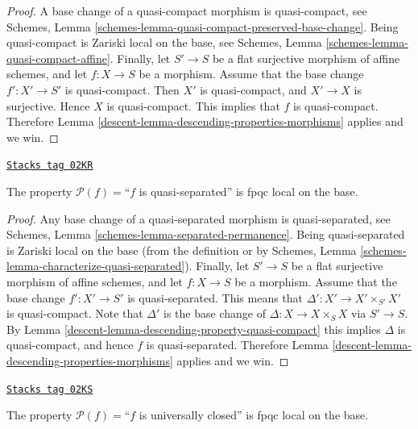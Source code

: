 \begin{proof}

A base change of a quasi-compact morphism is quasi-compact, see
Schemes, Lemma \ref{schemes-lemma-quasi-compact-preserved-base-change}.
Being quasi-compact is Zariski local on the base, see
Schemes, Lemma \ref{schemes-lemma-quasi-compact-affine}.
Finally, let
$S' \to S$ be a flat surjective morphism of affine schemes,
and let $f : X \to S$ be a morphism. Assume that the base change
$f' : X' \to S'$ is quasi-compact. Then $X'$ is quasi-compact,
and $X' \to X$ is surjective. Hence $X$ is quasi-compact.
This implies that $f$ is quasi-compact.
Therefore Lemma \ref{descent-lemma-descending-properties-morphisms} applies and we win.
\end{proof}

\begin{lemma}
\label{descent-lemma-descending-property-quasi-separated}
\href{https://stacks.math.columbia.edu/tag/02KR}{\texttt{Stacks tag 02KR}}

The property $\mathcal{P}(f) =$``$f$ is quasi-separated''
is fpqc local on the base.
\end{lemma}

\begin{proof}

Any base change of a quasi-separated morphism is quasi-separated, see
Schemes, Lemma \ref{schemes-lemma-separated-permanence}.
Being quasi-separated is Zariski local on the base (from the
definition or by
Schemes, Lemma \ref{schemes-lemma-characterize-quasi-separated}).
Finally, let
$S' \to S$ be a flat surjective morphism of affine schemes,
and let $f : X \to S$ be a morphism. Assume that the base change
$f' : X' \to S'$ is quasi-separated. This means that
$\Delta' : X' \to X'\times_{S'} X'$ is quasi-compact.
Note that $\Delta'$ is the base change of $\Delta : X \to X \times_S X$
via $S' \to S$. By Lemma \ref{descent-lemma-descending-property-quasi-compact}
this implies $\Delta$ is quasi-compact, and hence $f$ is
quasi-separated.
Therefore Lemma \ref{descent-lemma-descending-properties-morphisms} applies and we win.
\end{proof}

\begin{lemma}
\label{descent-lemma-descending-property-universally-closed}
\href{https://stacks.math.columbia.edu/tag/02KS}{\texttt{Stacks tag 02KS}}

The property $\mathcal{P}(f) =$``$f$ is universally closed''
is fpqc local on the base.
\end{lemma}

